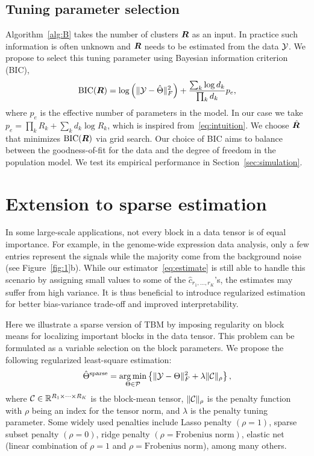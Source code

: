 \documentclass{article}
\begin{document}
\subsection{Tuning parameter selection}\label{sec:tuning}

Algorithm~\ref{alg:B} takes the number of clusters $\bm{R}$ as an input. In practice such information is often unknown and $\bm{R}$ needs to be estimated from the data $\mathcal{Y}$. We propose to select this tuning parameter using Bayesian information criterion (BIC), 
\begin{equation}\label{eq:BIC}
\text{BIC}(\bm{R}) =  \log\left(\lVert\mathcal{Y}-\hat \Theta\rVert_F^2\right)+{ \sum_k \log d_k \over \prod_k d_k}p_e,
\end{equation}
where $p_e$ is the effective number of parameters in the model. In our case we take $p_e=\prod_k R_k+\sum_k d_k\log R_k$, which is inspired from~\eqref{eq:intuition}. We choose $\hat {\bm{R}}$ that minimizes $\text{BIC}(\bm{R})$ via grid search. Our choice of BIC aims to balance between the goodness-of-fit for the data and the degree of freedom in the population model. We test its empirical performance in Section~\ref{sec:simulation}.  


\section{Extension to sparse estimation}\label{block}

In some large-scale applications, not every block in a data tensor is of equal importance. For example, in the genome-wide expression data analysis, only a few entries represent the signals while the majority come from the background noise (see Figure~\ref{fig:1}b). %
While our estimator~\eqref{eq:estimate} is still able to handle this scenario by assigning small values to some of the $\hat c_{r_1,\ldots,r_K}$'s, the estimates may suffer from high variance. It is thus beneficial to introduce regularized estimation for better bias-variance trade-off and improved interpretability. 

Here we illustrate a sparse version of TBM by imposing regularity on block means for localizing important blocks in the data tensor. This problem can be formulated as a variable selection on the block parameters. We propose the following regularized least-square estimation:
\[
\hat \Theta^{\text{sparse}}=\operatorname*{arg\,min}_{\Theta\in \mathcal{P}}\left\{\lVert\mathcal{Y}-\Theta\rVert_F^2+\lambda \lVert\mathcal{C}\rVert_\rho
\right\},
\]
where $\mathcal{C}\in\mathbb{R}^{R_1\times \cdots\times R_K}$ is the block-mean tensor, $\lVert\mathcal{C}\rVert_\rho$ is the penalty function with $\rho$ being an index for the tensor norm, and $\lambda$ is the penalty tuning parameter. Some widely used penalties include Lasso penalty $(\rho=1)$, sparse subset penalty $(\rho=0)$, ridge penalty $(\rho=\text{Frobenius norm})$, elastic net (linear combination of $\rho=1$ and $\rho=\text{Frobenius norm}$), among many others. 
\end{document}

